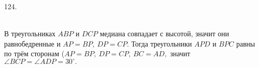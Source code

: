 124. \begin{figure}[ht!]
\end{figure}\\
В треугольниках $ABP$ и $DCP$ медиана совпадает с высотой, значит они равнобедренные и $AP=BP,\ DP=CP.$ Тогда треугольники $APD$ и $BPC$ равны по трём сторонам ($AP=BP,\ DP=CP,\ BC=AD,$ значит $\angle BCP=\angle ADP=30^\circ.$\\
